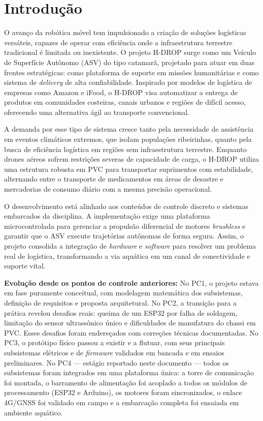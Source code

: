 \documentclass[12pt,a4paper]{article}
\begin{document}
\section{Introdução}

O avanço da robótica móvel tem impulsionado a criação de soluções logísticas versáteis, capazes de operar com eficiência onde a infraestrutura terrestre tradicional é limitada ou inexistente. O projeto H-DROP surge como um Veículo de Superfície Autônomo (ASV) do tipo catamarã, projetado para atuar em duas frentes estratégicas: como plataforma de suporte em missões humanitárias e como sistema de \textit{delivery} de alta confiabilidade. Inspirado por modelos de logística de empresas como Amazon e iFood, o H-DROP visa automatizar a entrega de produtos em comunidades costeiras, canais urbanos e regiões de difícil acesso, oferecendo uma alternativa ágil ao transporte convencional.

A demanda por esse tipo de sistema cresce tanto pela necessidade de assistência em eventos climáticos extremos, que isolam populações ribeirinhas, quanto pela busca de eficiência logística em regiões sem infraestrutura terrestre. Enquanto drones aéreos sofrem restrições severas de capacidade de carga, o H-DROP utiliza uma estrutura robusta em PVC para transportar suprimentos com estabilidade, alternando entre o transporte de medicamentos em áreas de desastre e mercadorias de consumo diário com a mesma precisão operacional.

O desenvolvimento está alinhado aos conteúdos de controle discreto e sistemas embarcados da disciplina. A implementação exige uma plataforma microcontrolada para gerenciar a propulsão diferencial de motores \textit{brushless} e garantir que o ASV execute trajetórias autônomas de forma segura. Assim, o projeto consolida a integração de \textit{hardware} e \textit{software} para resolver um problema real de logística, transformando a via aquática em um canal de conectividade e suporte vital.

\textbf{Evolução desde os pontos de controle anteriores:} No PC1, o projeto estava em fase puramente conceitual, com modelagem matemática dos subsistemas, definição de requisitos e proposta arquitetural. No PC2, a transição para a prática revelou desafios reais: queima de um ESP32 por falha de soldagem, limitação do sensor ultrassônico único e dificuldades de manufatura do chassi em PVC. Esses desafios foram endereçados com correções técnicas documentadas. No PC3, o protótipo físico passou a existir e a flutuar, com seus principais subsistemas elétricos e de \textit{firmware} validados em bancada e em ensaios preliminares. No PC4 — estágio reportado neste documento — todos os subsistemas foram integrados em uma plataforma única: a torre de comunicação foi montada, o barramento de alimentação foi acoplado a todos os módulos de processamento (ESP32 e Arduino), os motores foram sincronizados, o enlace 4G/GNSS foi validado em campo e a embarcação completa foi ensaiada em ambiente aquático.
\end{document}
